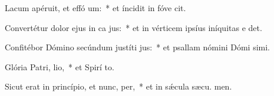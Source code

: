 \item Lacum apéruit, et effó um:~* et íncidit in fóve  cit.
\item Convertétur dolor ejus in ca jus:~* et in vérticem ipsíus iníquitas e det.
\item Confitébor Dómino secúndum justíti jus:~* et psallam nómini Dómi simi.
\item Glória Patri,  lio,~* et Spirí to.
\item Sicut erat in princípio, et nunc,  per,~* et in sǽcula sæcu. men.
